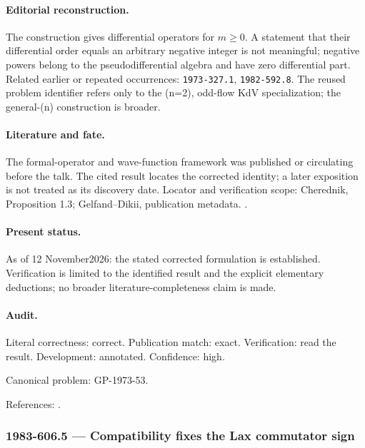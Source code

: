 \paragraph{Editorial reconstruction.} The construction gives differential operators for \(m\ge0\). A statement that their differential order equals an arbitrary negative integer is not meaningful; negative powers belong to the pseudodifferential algebra and have zero differential part. Related earlier or repeated occurrences: \texttt{1973-327.1}, \texttt{1982-592.8}. The reused problem identifier refers only to the (n=2), odd-flow KdV specialization; the general-(n) construction is broader.

\paragraph{Literature and fate.} The formal-operator and wave-function framework was published or circulating before the talk. The cited result locates the corrected identity; a later exposition is not treated as its discovery date. Locator and verification scope: Cherednik, Proposition 1.3; Gelfand--Dikii, publication metadata. \cite{gelfanddikii1976fractional,cherednik1978differential}.

\paragraph{Present status.} As of 12 November2026: the stated corrected formulation is established. Verification is limited to the identified result and the explicit elementary deductions; no broader literature-completeness claim is made.

\paragraph{Audit.} Literal correctness: correct. Publication match: exact. Verification: read the result. Development: annotated. Confidence: high.

\noindent Canonical problem: GP-1973-53.\par

\noindent References: \citep{gelfanddikii1976fractional,cherednik1978differential}.\par

\subsubsection{1983-606.5 --- Compatibility fixes the Lax commutator sign}

